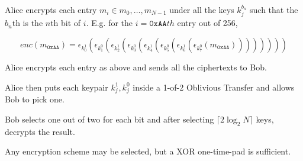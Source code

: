 \documentclass{article}
\begin{document}
Alice encrypts each entry $m_i \in m_{0},\ldots, m_{N-1}$ under all the keys $k^{b_n}_{j}$ such that the $b_n$th is the $n$th bit of $i$. E.g. for the $i=\texttt{0xAA}th$ entry out of 256,  

$$enc(m_{\texttt{0xAA}}) = 
\epsilon_{k^{1}_{0}}(\epsilon_{k^{0}_{1}}(\epsilon_{k^{1}_{2}}(\epsilon_{k^{0}_{3}}(\epsilon_{k^{1}_{4}}(\epsilon_{k^{0}_{5}}(\epsilon_{k^{1}_{6}}(\epsilon_{k^{0}_{7}}(m_{\texttt{0xAA}}))))))))
$$

Alice encrypts each entry as above and sends all the ciphertexts to Bob.

Alice then puts each keypair $k^{1}_{j}, k^{0}_j$ inside a 1-of-2 Oblivious Transfer and allows Bob to pick one.

Bob selects one out of two for each bit and after selecting $\lceil 2 \log_2 N \rceil$ keys, decrypts the result.

Any encryption scheme may be selected, but a XOR one-time-pad is sufficient.
\end{document}

